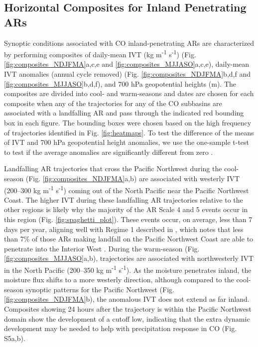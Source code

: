 \documentclass[draft]{agujournal2019}
\begin{document}
\subsection{Horizontal Composites for Inland Penetrating ARs}
\label{sec:results:composite_analysis}

Synoptic conditions associated with CO inland-penetrating ARs are characterized by performing composites of daily-mean IVT (kg m\textsuperscript{-1} s\textsuperscript{-1}) (Fig. \ref{fig:composites_NDJFMA}a,c,e and \ref{fig:composites_MJJASO}a,c,e), daily-mean IVT anomalies (annual cycle removed) (Fig. \ref{fig:composites_NDJFMA}b,d,f and \ref{fig:composites_MJJASO}b,d,f), and 700 hPa geopotential heights (m). The composites are divided into cool- and warm-seasons and dates are chosen for each composite when any of the trajectories for any of the CO subbasins are associated with a landfalling AR and pass through the indicated red bounding box in each figure. The bounding boxes were chosen based on the high frequency of trajectories identified in Fig. \ref{fig:heatmaps}. To test the difference of the means of IVT and 700 hPa geopotential height anomalies, we use the one-sample t-test to test if the average anomalies are significantly different from zero \cite{WILKS2019ch5statistics}. 


Landfalling AR trajectories that cross the Pacific Northwest during the cool-season (Fig. \ref{fig:composites_NDJFMA}a,b) are associated with westerly IVT (200--300 kg m\textsuperscript{-1} s\textsuperscript{-1}) coming out of the North Pacific near the Pacific Northwest Coast. The higher IVT during these landfalling AR trajectories relative to the other regions is likely why the majority of the AR Scale 4 and 5 events occur in this region (Fig. \ref{fig:spaghetti_plot}). These events occur, on average, less than 7 days per year, aligning well with Regime 1 described in , which notes that less than 7\% of those ARs making landfall on the Pacific Northwest Coast are able to penetrate into the Interior West \cite{Rutz2015}. During the warm-season (Fig. \ref{fig:composites_MJJASO}a,b), trajectories are associated with northwesterly IVT in the North Pacific (200--350 kg m\textsuperscript{-1} s\textsuperscript{-1}). As the moisture penetrates inland, the moisture flux shifts to a more westerly direction, although compared to the cool-season synoptic patterns for the Pacific Northwest (Fig. \ref{fig:composites_NDJFMA}b), the anomalous IVT does not extend as far inland. Composites showing 24 hours after the trajectory is within the Pacific Northwest domain show the development of a cutoff low, indicating that the extra dynamic development may be needed to help with precipitation response in CO (Fig. S5a,b).
\end{document}
